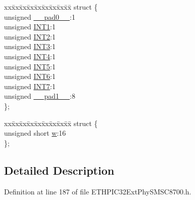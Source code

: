 \begin{DoxyCompactItemize}
\begin{tabbing}
\end{tabbing}\item 
\begin{tabbing}
xx\=xx\=xx\=xx\=xx\=xx\=xx\=xx\=xx\=\kill
struct \{\\
\>unsigned \hyperlink{union_____i_n_t_m_a_s_kbits__t_adf71f3d8410c1f1dbbc96680a92c49af}{\_\_pad0\_\_}:1\\
\>unsigned \hyperlink{union_____i_n_t_m_a_s_kbits__t_a47cc5a5beb081340f905482dc80e00d3}{INT1}:1\\
\>unsigned \hyperlink{union_____i_n_t_m_a_s_kbits__t_a701a787be03bde234890290d2a507f1d}{INT2}:1\\
\>unsigned \hyperlink{union_____i_n_t_m_a_s_kbits__t_a6c886eb45c0096c0d3bc37b05416b171}{INT3}:1\\
\>unsigned \hyperlink{union_____i_n_t_m_a_s_kbits__t_af8c7aac64c1dded6d4bab1e8d958bc19}{INT4}:1\\
\>unsigned \hyperlink{union_____i_n_t_m_a_s_kbits__t_a832ae44f354c9afd727f5ace181e439f}{INT5}:1\\
\>unsigned \hyperlink{union_____i_n_t_m_a_s_kbits__t_a32ed04340c8ad7c9e9615760fe9c56e9}{INT6}:1\\
\>unsigned \hyperlink{union_____i_n_t_m_a_s_kbits__t_ace3cce0f8bc2d246805ad9a8c00ea02e}{INT7}:1\\
\>unsigned \hyperlink{union_____i_n_t_m_a_s_kbits__t_acaf2d0924a107ec6e8d2e31febaf66f9}{\_\_pad1\_\_}:8\\
\}; \\

\end{tabbing}\item 
\begin{tabbing}
xx\=xx\=xx\=xx\=xx\=xx\=xx\=xx\=xx\=\kill
struct \{\\
\>unsigned short \hyperlink{union_____i_n_t_m_a_s_kbits__t_a160850a4684a3e82c2323033964f2e98}{w}:16\\
\}; \\

\end{tabbing}\end{DoxyCompactItemize}


\subsection{Detailed Description}


Definition at line 187 of file E\+T\+H\+P\+I\+C32\+Ext\+Phy\+S\+M\+S\+C8700.\+h.



